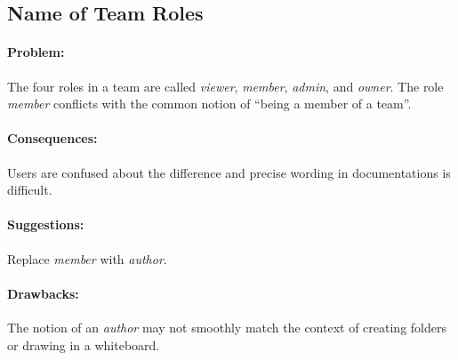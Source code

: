 \subsection{Name of Team Roles}

\paragraph{Problem:}
The four roles in a team are called \textit{viewer}, \textit{member}, \textit{admin}, and \textit{owner}.
The role \textit{member} conflicts with the common notion of \enquote{being a member of a team}.

\paragraph{Consequences:}
Users are confused about the difference and precise wording in documentations is difficult.

\paragraph{Suggestions:}
Replace \textit{member} with \textit{author}.

\paragraph{Drawbacks:}
The notion of an \textit{author} may not smoothly match the context of creating folders or drawing in a whiteboard.
